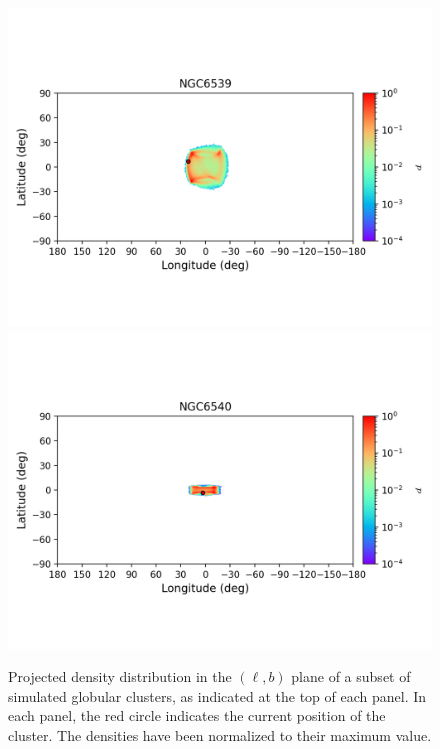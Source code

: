 \begin{figure}
\begin{center}
                \includegraphics[clip=true, trim = 0mm 20mm 0mm 10mm, width=1\columnwidth]{images/error_plots_NGC6539.png}
                \includegraphics[clip=true, trim = 0mm 20mm 0mm 10mm, width=1\columnwidth]{images/error_plots_NGC6540.png}
            \end{center}
            \caption[]{Projected density distribution in the $(\ell, b)$ plane of a subset of simulated globular clusters, as indicated at the top of each panel. In each panel, the red circle indicates the current position of the cluster. The densities have been normalized to their maximum value.}\label{stream12}
        \end{figure}

